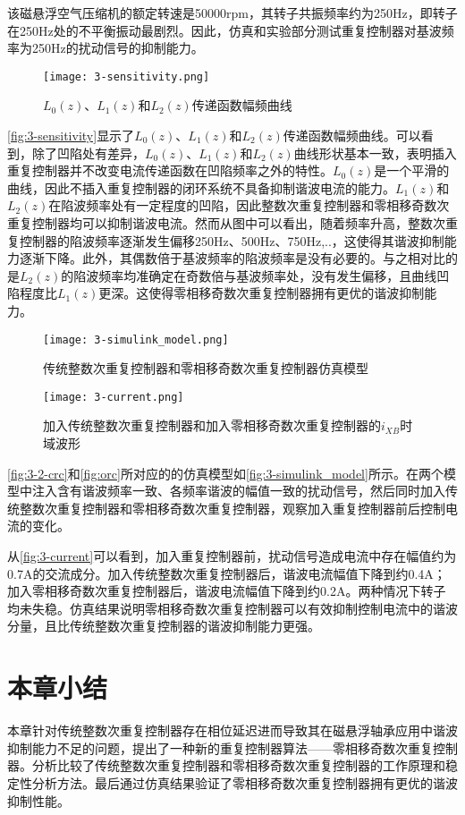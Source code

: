 \documentclass[
  lang=cn,
  degree=master,
  openany,oneside
]{nuaathesis}
\begin{document}
该磁悬浮空气压缩机的额定转速是50000rpm，其转子共振频率约为250Hz，即转子在250Hz处的不平衡振动最剧烈。因此，仿真和实验部分测试重复控制器对基波频率为250Hz的扰动信号的抑制能力。
\begin{figure}[h!]
	\texttt{[image: 3-sensitivity.png]}
	\caption{$L_0(z)$、$L_1(z)$和$L_2(z)$传递函数幅频曲线}
	\label{fig:3-sensitivity}
\end{figure}

\autoref{fig:3-sensitivity}显示了$L_0(z)$、$L_1(z)$和$L_2(z)$传递函数幅频曲线。可以看到，除了凹陷处有差异，$L_0(z)$、$L_1(z)$和$L_2(z)$曲线形状基本一致，表明插入重复控制器并不改变电流传递函数在凹陷频率之外的特性。$L_0(z)$是一个平滑的曲线，因此不插入重复控制器的闭环系统不具备抑制谐波电流的能力。$L_1(z)$和$L_2(z)$在陷波频率处有一定程度的凹陷，因此整数次重复控制器和零相移奇数次重复控制器均可以抑制谐波电流。然而从图中可以看出，随着频率升高，整数次重复控制器的陷波频率逐渐发生偏移250Hz、500Hz、750Hz,..，这使得其谐波抑制能力逐渐下降。此外，其偶数倍于基波频率的陷波频率是没有必要的。与之相对比的是$L_2(z)$的陷波频率均准确定在奇数倍与基波频率处，没有发生偏移，且曲线凹陷程度比$L_1(z)$更深。这使得零相移奇数次重复控制器拥有更优的谐波抑制能力。

\begin{figure}[h!]
	\texttt{[image: 3-simulink\_model.png]}
	\caption{传统整数次重复控制器和零相移奇数次重复控制器仿真模型}
	\label{fig:3-simulink_model}
\end{figure}

\begin{figure}[h!]
	\texttt{[image: 3-current.png]}
	\caption{加入传统整数次重复控制器和加入零相移奇数次重复控制器的$i_{XB}$时域波形}
	\label{fig:3-current}
\end{figure}

\autoref{fig:3-2-crc}和\autoref{fig:orc}所对应的的仿真模型如\autoref{fig:3-simulink_model}所示。在两个模型中注入含有谐波频率一致、各频率谐波的幅值一致的扰动信号，然后同时加入传统整数次重复控制器和零相移奇数次重复控制器，观察加入重复控制器前后控制电流的变化。



从\autoref{fig:3-current}可以看到，加入重复控制器前，扰动信号造成电流中存在幅值约为0.7A的交流成分。加入传统整数次重复控制器后，谐波电流幅值下降到约0.4A；加入零相移奇数次重复控制器后，谐波电流幅值下降到约0.2A。两种情况下转子均未失稳。仿真结果说明零相移奇数次重复控制器可以有效抑制控制电流中的谐波分量，且比传统整数次重复控制器的谐波抑制能力更强。

\section{本章小结}
本章针对传统整数次重复控制器存在相位延迟进而导致其在磁悬浮轴承应用中谐波抑制能力不足的问题，提出了一种新的重复控制器算法——零相移奇数次重复控制器。分析比较了传统整数次重复控制器和零相移奇数次重复控制器的工作原理和稳定性分析方法。最后通过仿真结果验证了零相移奇数次重复控制器拥有更优的谐波抑制性能。
\end{document}

